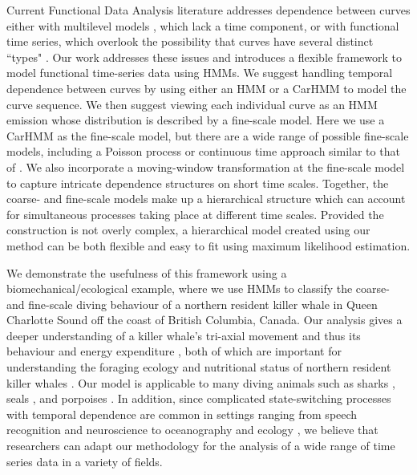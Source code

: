 

Current Functional Data Analysis literature addresses dependence between curves either with multilevel models \citep{Chen:2012,Di:2009}, which lack a time component, or with functional time series, which overlook the possibility that curves have several distinct ``types" \citep{Kokoszka:2018}. Our work addresses these issues and introduces a flexible framework to model functional time-series data using HMMs.
We suggest handling temporal dependence between curves by using either an HMM or a CarHMM to model the curve sequence. We then suggest viewing each individual curve as an HMM emission whose distribution is described by a fine-scale model. Here we use a CarHMM as the fine-scale model, but there are a wide range of possible fine-scale models, including a Poisson process or continuous time approach similar to that of \citet{Michelot:2019}. We also incorporate a moving-window transformation at the fine-scale model to capture intricate dependence structures on short time scales. Together, the coarse- and fine-scale models make up a hierarchical structure which can account for simultaneous processes taking place at different time scales. Provided the construction is not overly complex, a hierarchical model created using our method can be both flexible and easy to fit using maximum likelihood estimation.

We demonstrate the usefulness of this framework using a biomechanical/ecological example, where we use HMMs to classify the coarse- and fine-scale diving behaviour of a northern resident killer whale in Queen Charlotte Sound off the coast of British Columbia, Canada. Our analysis gives a deeper understanding of a killer whale's tri-axial movement and thus its behaviour and energy expenditure \citep{Gleiss:2011,Qasem:2012}, both of which are important for understanding the foraging ecology and nutritional status of northern resident killer whales \citep{Noren:2011}. Our model is applicable to many diving animals such as sharks \citep{Adam:2019}, seals \citep{Dot:2016}, and porpoises \citep{Barajas:2017}. In addition, since complicated state-switching processes with temporal dependence are common in settings ranging from speech recognition \citep{Juang:1991} and neuroscience \citep{Langrock:2013} to oceanography \citep{Bulla:2012} and ecology \citep{Adam:2019}, we believe that researchers can adapt our methodology for the analysis of a wide range of time series data in a variety of fields.

